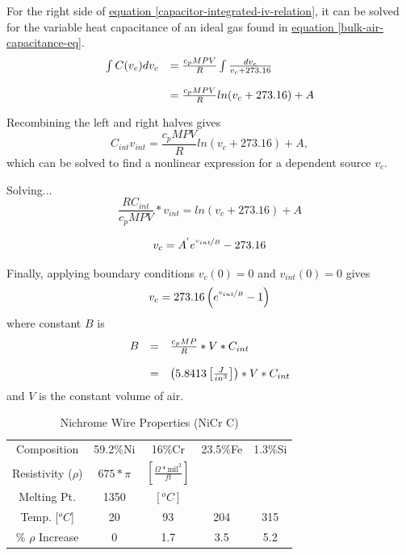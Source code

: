 \documentclass[10pt, twocolumn]{article}
\begin{document}
For the right side of
\hyperref[capacitor-integrated-iv-relation]
{equation \ref{capacitor-integrated-iv-relation}},
it can be solved for the variable heat capacitance
of an ideal gas found in
\hyperref[bulk-air-capacitance-eq]{equation \ref{bulk-air-capacitance-eq}}.
\begin{equation*}
\begin{array}{c l}
\int C(v_{c})dv_{c}	&=\frac{c_{p}MPV}{R}\int\frac{dv_{c}}{v_{c}+273.16}	\\
&\\
&=\frac{c_{p}MPV}{R}ln(v_{c}+273.16)+A	\\
\end{array}
\end{equation*}

Recombining the left and right halves gives
\begin{equation*}
C_{int}v_{int}=\frac{c_{p}MPV}{R}ln(v_{c}+273.16)+A,
\end{equation*}
which can be solved to find a nonlinear expression
for a dependent source $v_{c}$.

Solving...
\begin{equation*}
\frac{RC_{int}}{c_{p}MPV}*v_{int}=ln(v_{c}+273.16)+A
\end{equation*}

\begin{equation*}
v_{c}=A^{'}e^{\nicefrac{v_{int}}{B}}-273.16
\end{equation*}

Finally, applying boundary conditions $v_{c}(0)=0$ and $v_{int}(0)=0$ gives
\begin{equation}
v_{c}=273.16\left(e^{\nicefrac{v_{int}}{B}}-1\right)
\end{equation}
where constant $B$ is
\begin{equation}
\begin{array}{c c l}
B&=&\frac{c_{p}MP}{R}*V*C_{int}\\
&&\\
&=&\left(5.8413\left[\frac{J}{in^{3}}\right]\right)*V*C_{int}\\
\end{array}
\end{equation}
and $V$ is the constant volume of air.

\begin{table}
	\centering
	\caption{Nichrome Wire Properties (NiCr C)}
	\begin{tabular}{c | c | c | c | c}
\hline
Composition	&59.2\%Ni	&16\%Cr	&23.5\%Fe	&1.3\%Si	\\
Resistivity ($\rho$)	&$675*\pi$	&$\left[\frac{\Omega*\textrm{mil}^{2}}{ft}\right]$	&	&	\\
Melting Pt.	&1350	&$[^{o}C]$	&	&	\\
\hline\hline
Temp. [$^{o}C$]	&20	&93	&204	&315	\\
\% $\rho$ Increase	&0	&1.7	&3.5	&5.2	\\
\hline
	\end{tabular}
	\label{nichrome-properties-table}
\end{table}
\end{document}
